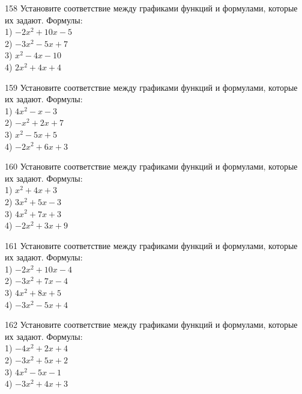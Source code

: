 \documentclass[4apaper]{article}
\begin{document}
\begin{taskBN}{158}
Установите соответствие между графиками функций и формулами, которые их задают. Формулы: \\1) $-2x^2+10x-5$\\2) $-3x^2-5x+7$\\3) $x^2-4x-10$\\4) $2x^2+4x+4$
\end{taskBN}

\begin{taskBN}{159}
Установите соответствие между графиками функций и формулами, которые их задают. Формулы: \\1) $4x^2-x-3$\\2) $-x^2+2x+7$\\3) $x^2-5x+5$\\4) $-2x^2+6x+3$
\end{taskBN}

\begin{taskBN}{160}
Установите соответствие между графиками функций и формулами, которые их задают. Формулы: \\1) $x^2+4x+3$\\2) $3x^2+5x-3$\\3) $4x^2+7x+3$\\4) $-2x^2+3x+9$
\end{taskBN}

\begin{taskBN}{161}
Установите соответствие между графиками функций и формулами, которые их задают. Формулы: \\1) $-2x^2+10x-4$\\2) $-3x^2+7x-4$\\3) $4x^2+8x+5$\\4) $-3x^2-5x+4$
\end{taskBN}

\begin{taskBN}{162}
Установите соответствие между графиками функций и формулами, которые их задают. Формулы: \\1) $-4x^2+2x+4$\\2) $-3x^2+5x+2$\\3) $4x^2-5x-1$\\4) $-3x^2+4x+3$
\end{taskBN}
\end{document}
